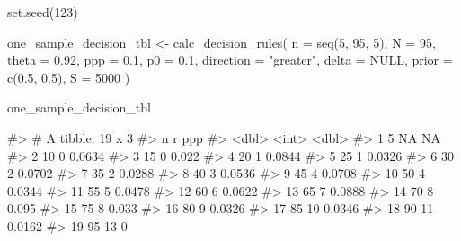 \begin{Schunk}
\begin{Sinput}
set.seed(123)

one_sample_decision_tbl <- 
  calc_decision_rules(
    n = seq(5, 95, 5),
    N = 95, 
    theta = 0.92, 
    ppp = 0.1, 
    p0 = 0.1, 
    direction = "greater",
    delta = NULL, 
    prior = c(0.5, 0.5), 
    S = 5000
    )
\end{Sinput}
\end{Schunk}

\begin{Schunk}
\begin{Sinput}
one_sample_decision_tbl
\end{Sinput}
\begin{Soutput}
#> # A tibble: 19 x 3
#>        n     r     ppp
#>    <dbl> <int>   <dbl>
#>  1     5    NA NA     
#>  2    10     0  0.0634
#>  3    15     0  0.022 
#>  4    20     1  0.0844
#>  5    25     1  0.0326
#>  6    30     2  0.0702
#>  7    35     2  0.0288
#>  8    40     3  0.0536
#>  9    45     4  0.0708
#> 10    50     4  0.0344
#> 11    55     5  0.0478
#> 12    60     6  0.0622
#> 13    65     7  0.0888
#> 14    70     8  0.095 
#> 15    75     8  0.033 
#> 16    80     9  0.0326
#> 17    85    10  0.0346
#> 18    90    11  0.0162
#> 19    95    13  0
\end{Soutput}
\end{Schunk}

